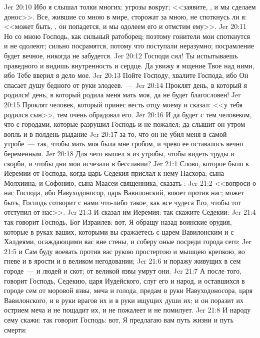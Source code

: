 \vs Jer 20:10 Ибо я слышал толки многих: угрозы вокруг; <<заявите, , и мы сделаем донос>>. Все, жившие со мною в мире, сторожат за мною, не споткнусь ли я: <<может быть, , он попадется, и мы одолеем его и отмстим ему>>.
\vs Jer 20:11 Но со мною Господь, как сильный ратоборец; поэтому гонители мои споткнутся и не одолеют; сильно посрамятся, потому что поступали неразумно; посрамление будет вечное, никогда не забудется.
\vs Jer 20:12 Господи сил! Ты испытываешь праведного и видишь внутренность и сердце. Да увижу я мщение Твое над ними, ибо Тебе вверил я дело мое.
\vs Jer 20:13 Пойте Господу, хвалите Господа, ибо Он спасает душу бедного от руки злодеев.~---
\vs Jer 20:14 Проклят день, в который я родился! день, в который родила меня мать моя, да не будет благословен!
\vs Jer 20:15 Проклят человек, который принес весть отцу моему и сказал: <<у тебя родился сын>>,  тем очень обрадовал его.
\vs Jer 20:16 И да будет с тем человеком, что с городами, которые разрушил Господь и не пожалел; да слышит он утром вопль и в полдень рыдание
\vs Jer 20:17 за то, что он не убил меня в самой утробе~--- так, чтобы мать моя была мне гробом, и чрево ее оставалось вечно беременным.
\vs Jer 20:18 Для чего вышел я из утробы, чтобы видеть труды и скорби, и чтобы дни мои исчезали в бесславии?
\vs Jer 21:1 Слово, которое было к Иеремии от Господа, когда царь Седекия прислал к нему Пасхора, сына Молхиина, и Софонию, сына Маасеи священника, сказать :
\vs Jer 21:2 <<вопроси о нас Господа, ибо Навуходоносор, царь Вавилонский, воюет против нас; может быть, Господь сотворит с нами что-либо такое, как все чудеса Его, чтобы тот отступил от нас>>.
\rsbpar\vs Jer 21:3 И сказал им Иеремия: так скажите Седекии:
\vs Jer 21:4 так говорит Господь, Бог Израилев: вот, Я обращу назад воинские орудия, которые в руках ваших, которыми вы сражаетесь с царем Вавилонским и с Халдеями, осаждающими вас вне стены, и соберу оные посреди города сего;
\vs Jer 21:5 и Сам буду воевать против вас рукою простертою и мышцею крепкою, во гневе и в ярости и в великом негодовании;
\vs Jer 21:6 и поражу живущих в сем городе~--- и людей и скот; от великой язвы умрут они.
\vs Jer 21:7 А после того, говорит Господь, Седекию, царя Иудейского, слуг его и народ, и оставшихся в городе сем от моровой язвы, меча и голода, предам в руки Навуходоносора, царя Вавилонского, и в руки врагов их и в руки ищущих души их; и он поразит их острием меча и не пощадит их, и не пожалеет и не помилует.
\vs Jer 21:8 И народу сему скажи: так говорит Господь: вот, Я предлагаю вам путь жизни и путь смерти:
